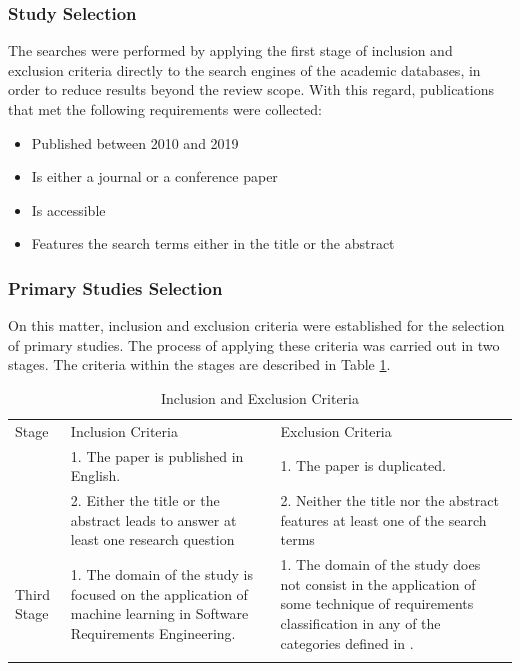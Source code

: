 \documentclass[conference]{IEEEtran}
\begin{document}
\subsubsection{Study Selection}

The searches were performed by applying the first stage of inclusion and exclusion criteria directly to the search engines of the academic databases, in order to reduce results beyond the review scope. With this regard, publications that met the following requirements were collected:

\begin{itemize}
  \item{Published between 2010 and 2019}
  \item{Is either a journal or a conference paper}
  \item{Is accessible}
  \item{Features the search terms either in the title or the abstract}
\end{itemize}

\subsubsection{Primary Studies Selection}

On this matter, inclusion and exclusion criteria were established for the selection of primary studies. The process of applying these criteria was carried out in two stages. The criteria within the stages are described in Table \ref{tab:inclusion-exclusion-criteria}.

\begin{table}[!htbp]
\caption{Inclusion and Exclusion Criteria}
\begin{center}
\label{tab:inclusion-exclusion-criteria}       %
\begin{tabular}{p{1.3cm}p{3cm}p{3cm}}
    \hline\noalign{\smallskip}
    Stage & Inclusion Criteria & Exclusion Criteria  \\
    \noalign{\smallskip}\hline\noalign{\smallskip}
    \multirow{2}{1.3cm}{Second Stage}& 1. The paper is published in English. & 1. The paper is duplicated. \\ & 2. Either the title or the abstract leads to answer at least one research question & 2. Neither the title nor the abstract features at least one of the search terms \\
    \hline\noalign{\smallskip}
    Third Stage & 1. The domain of the study is focused on the application of machine learning in Software Requirements Engineering. & 1. The domain of the study does not consist in the application of some technique of requirements classification in any of the categories defined in \cite{Wiegers2013}. \\
    \hline\noalign{\smallskip}
\end{tabular}
\end{center}
\end{table}
\end{document}
